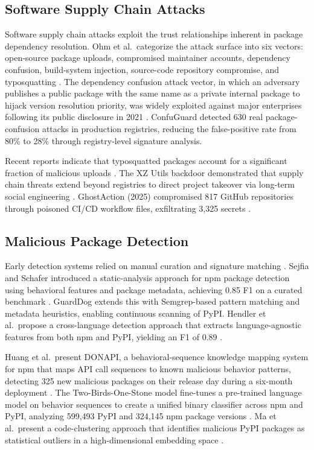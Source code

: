 \documentclass[conference]{IEEEtran}
\begin{document}
\subsection{Software Supply Chain Attacks}

Software supply chain attacks exploit the trust relationships inherent in package dependency resolution. Ohm et al.\ categorize the attack surface into six vectors: open-source package uploads, compromised maintainer accounts, dependency confusion, build-system injection, source-code repository compromise, and typosquatting \cite{ohm2022backstabber}. The dependency confusion attack vector, in which an adversary publishes a public package with the same name as a private internal package to hijack version resolution priority, was widely exploited against major enterprises following its public disclosure in 2021 \cite{vu2023empiricaldepconf}. ConfuGuard \cite{confuguard2024} detected 630 real package-confusion attacks in production registries, reducing the false-positive rate from 80\% to 28\% through registry-level signature analysis.

Recent reports indicate that typosquatted packages account for a significant fraction of malicious uploads \cite{sonatype2025report}. The XZ Utils backdoor demonstrated that supply chain threats extend beyond registries to direct project takeover via long-term social engineering \cite{xzutils2025springer}. GhostAction (2025) compromised 817 GitHub repositories through poisoned CI/CD workflow files, exfiltrating 3,325 secrets \cite{gitguardian2025ghostaction}.

\subsection{Malicious Package Detection}

Early detection systems relied on manual curation and signature matching \cite{duan2020measuring}. Sejfia and Schafer introduced a static-analysis approach for npm package detection using behavioral features and package metadata, achieving 0.85 F1 on a curated benchmark \cite{sejfia2022practical}. GuardDog \cite{guarddog2023msr} extends this with Semgrep-based pattern matching and metadata heuristics, enabling continuous scanning of PyPI. Hendler et al.\ propose a cross-language detection approach that extracts language-agnostic features from both npm and PyPI, yielding an F1 of 0.89 \cite{crosslang2023acsac}.

Huang et al.\ present DONAPI, a behavioral-sequence knowledge mapping system for npm that maps API call sequences to known malicious behavior patterns, detecting 325 new malicious packages on their release day during a six-month deployment \cite{donapi2024usenix}. The Two-Birds-One-Stone model fine-tunes a pre-trained language model on behavior sequences to create a unified binary classifier across npm and PyPI, analyzing 599,493 PyPI and 324,145 npm package versions \cite{twobirdstone2024tosem}. Ma et al.\ present a code-clustering approach that identifies malicious PyPI packages as statistical outliers in a high-dimensional embedding space \cite{needle2023ase}.
\end{document}
